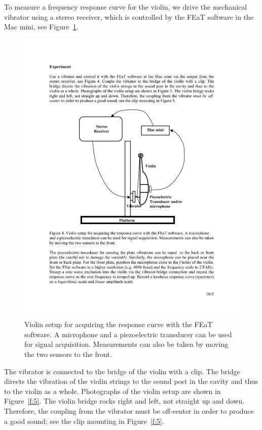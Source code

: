 \documentclass[11pt]{NSF}
\begin{document}
To measure a frequency response curve for the violin, we drive the
mechanical vibrator using a stereo receiver, which is controlled by 
the FEaT software in the Mac mini, see Figure~\ref{f:4}.
%
\begin{figure}[hbtp]
\begin{center}
\includegraphics[width=.5\textwidth]{fig10_4}
\caption{Violin setup for acquiring the response curve with the FEaT
software. A microphone and a piezoelectric transducer can be used for
signal acquisition. Measurements can also be taken by moving the two
sensors to the front.}
\label{f:4}
\end{center}
\end{figure}
%
The  vibrator is connected to the bridge of the violin with a clip. 
The bridge directs
the vibration of the violin strings to the sound post in the cavity
and thus to the violin as a whole. Photographs of the violin setup are
shown in Figure~\ref{f:5}. The violin bridge rocks right and left, not
straight up and down. Therefore, the coupling from the vibrator must
be off-center in order to produce a good sound; see the clip mounting
in Figure~\ref{f:5}.
%
\end{document}

